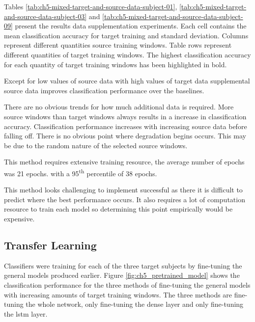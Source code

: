 Tables \ref{tab:ch5-mixed-target-and-source-data-subject-01}, \ref{tab:ch5-mixed-target-and-source-data-subject-03} and \ref{tab:ch5-mixed-target-and-source-data-subject-09} present the results data supplementation experiments. Each cell contains the mean classification accuracy for target training and standard deviation. Columns represent different quantities source training windows. Table rows represent different quantities of target training windows. The highest classification accuracy for each quantity of target training windows has been highlighted in bold.



Except for low values of source data with high values of target data supplemental source data improves classification performance over the baselines. 

There are no obvious trends for how much additional data is required. More source windows than target windows always results in a increase in classification accuracy. Classification performance increases with increasing source data before falling off. There is no obvious point where degradation begins occurs. This may be due to the random nature of the selected source windows.

This method requires extensive training resource, the average number of epochs was 21 epochs. with a 95\textsuperscript{th} percentile of 38 epochs.

This method looks challenging to implement successful as there it is difficult to predict where the best performance occurs. It also requires a lot of computation resource to train each model so determining this point empirically would be expensive.

\subsection{Transfer Learning}
Classifiers were training for each of the three target subjects by fine-tuning the general models produced earlier. Figure \ref{fig:ch5_pretrained_model} shows the classification performance for the three methods of fine-tuning the general models with increasing amounts of target training windows. The three methods are fine-tuning the whole network, only fine-tuning the dense layer and only fine-tuning the \acrshort{lstm} layer.

